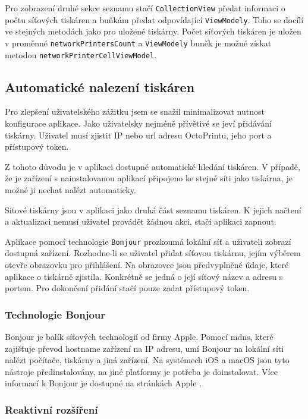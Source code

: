 Pro zobrazení druhé sekce seznamu stačí \texttt{CollectionView} předat informaci o počtu síťových tiskáren a buňkám předat odpovídající \texttt{ViewModely}.
Toho se docílí ve stejných metodách jako pro uložené tiskárny.
Počet síťových tiskáren je uložen v proměnné \texttt{networkPrintersCount} a \texttt{ViewModely} buněk je možné získat metodou \texttt{networkPrinterCellViewModel}.

\subsection{Automatické nalezení tiskáren}

Pro zlepšení uživatelského zážitku jsem se snažil minimalizovat nutnost konfigurace aplikace.
Jako uživatelsky nejméně přívětivé se jeví přidávání tiskárny.
Uživatel musí zjistit IP nebo \acrshort{url} adresu OctoPrintu, jeho port a přístupový token.

Z tohoto důvodu je v aplikaci dostupné automatické hledání tiskáren.
V případě, že je zařízení s nainstalovanou aplikací připojeno ke stejné síti jako tiskárna, je možné ji nechat nalézt automaticky.

Síťové tiskárny jsou v aplikaci jako druhá část seznamu tiskáren.
K jejich načtení a aktualizaci nemusí uživatel provádět žádnou akci, stačí aplikaci zapnout.

Aplikace pomocí technologie \texttt{Bonjour} prozkoumá lokální síť a uživateli zobrazí dostupná zařízení.
Rozhodne-li se uživatel přidat síťovou tiskárnu, jejím výběrem otevře obrazovku pro přihlášení.
Na obrazovce jsou předvyplněné údaje, které aplikace o tiskárně zjistila.
Konkrétně se jedná o její síťový název a adresu s portem.
Pro dokončení přidání stačí pouze zadat přístupový token.

\subsubsection*{Technologie Bonjour}

Bonjour je balík síťových technologií od firmy Apple.
Pomocí \acrfull{mdns}, které zajišťuje převod hostname zařízení na IP adresu, umí Bonjour na lokální síti nalézt počítače, tiskárny a jiná zařízení.
Na systémech iOS a macOS jsou tyto nástroje předinstalovány, na jiné platformy je potřeba je doinstalovat.
Více informací k Bonjour je dostupné na stránkách Apple \cite{apple-bonjour}.

\subsubsection*{Reaktivní rozšíření}

